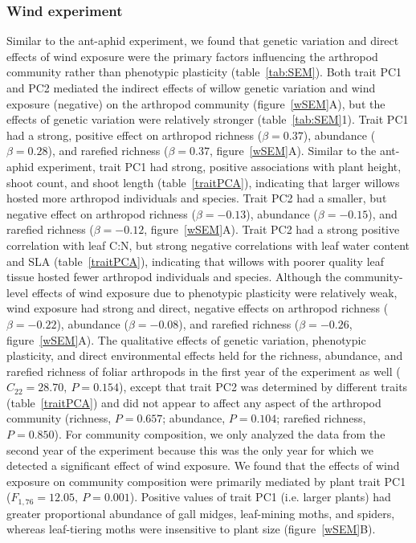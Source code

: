 \documentclass[11pt]{article}
\begin{document}
\subsubsection*{Wind experiment}

Similar to the ant-aphid experiment, we found that genetic
variation and direct effects of wind exposure were the primary factors
influencing the arthropod community rather than phenotypic plasticity
(table~\ref{tab:SEM}). Both trait PC1 and PC2 mediated the indirect effects of
willow genetic variation and wind exposure (negative) on the arthropod
community (figure~\ref{wSEM}A), but the effects of genetic variation were
relatively stronger (table~\ref{tab:SEM}1). Trait PC1 had a strong, positive effect
on arthropod richness ($\beta = 0.37$), abundance ($\beta =
0.28$), and rarefied richness ($\beta = 0.37$, figure~\ref{wSEM}A). Similar to the
ant-aphid experiment, trait PC1 had strong, positive associations with
plant height, shoot count, and shoot length (table~\ref{traitPCA}), indicating that
larger willows hosted more arthropod individuals and species. Trait PC2 had a smaller,
but negative effect on arthropod richness ($\beta = -0.13$),
abundance ($\beta = -0.15$), and rarefied richness ($\beta =
-0.12$, figure~\ref{wSEM}A). Trait PC2 had a strong positive correlation with leaf
C:N, but strong negative correlations with leaf water content and SLA
(table~\ref{traitPCA}), indicating that willows with poorer quality leaf tissue
hosted fewer arthropod individuals and species. Although the community-level effects of
wind exposure due to phenotypic plasticity were relatively weak, wind
exposure had strong and direct, negative effects on arthropod richness
($\beta = -0.22$), abundance ($\beta = -0.08$), and rarefied
richness ($\beta = -0.26$, figure~\ref{wSEM}A). The qualitative effects of
genetic variation, phenotypic plasticity, and direct
environmental effects held for the richness, abundance, and rarefied
richness of foliar arthropods in the first year of the experiment as
well (\(C_{22}=28.70,\ P=0.154\)), except that trait PC2 was determined by
different traits (table~\ref{traitPCA}) and did not appear to affect any aspect of
the arthropod community (richness, \(P=0.657\); abundance,
\(P=0.104\); rarefied richness, \(P=0.850\)). For community
composition, we only analyzed the data from the second year of the
experiment because this was the only year for which we detected a
significant effect of wind exposure. We found that the effects of wind
exposure on community composition were primarily mediated by plant trait
PC1 (\(F_{1,76}=12.05,\ P=0.001\)). Positive values of trait PC1 (i.e. larger
plants) had greater proportional abundance of gall midges, leaf-mining
moths, and spiders, whereas leaf-tiering moths were insensitive to plant
size (figure~\ref{wSEM}B).
\end{document}
